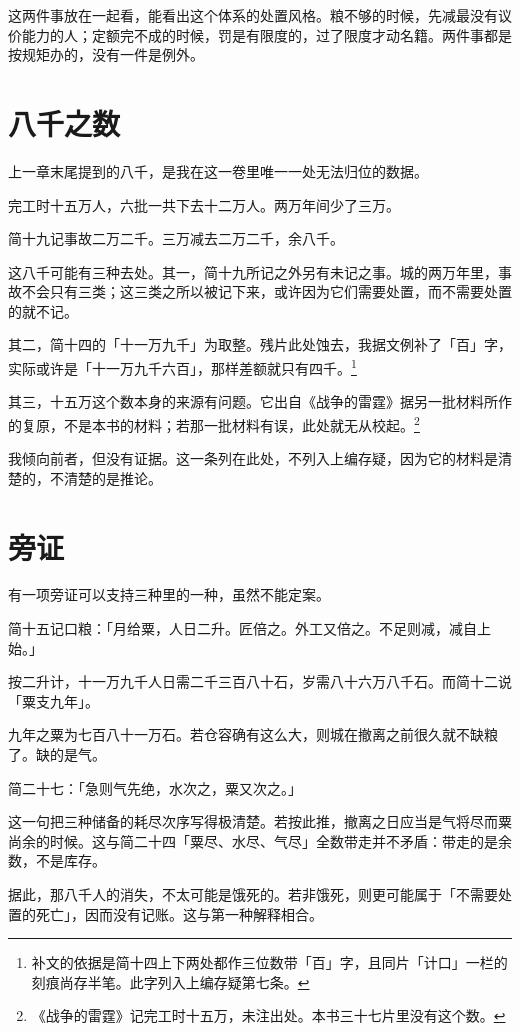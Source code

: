 这两件事放在一起看，能看出这个体系的处置风格。粮不够的时候，先减最没有议价能力的人；定额完不成的时候，罚是有限度的，过了限度才动名籍。两件事都是按规矩办的，没有一件是例外。

\section{八千之数}

上一章末尾提到的八千，是我在这一卷里唯一一处无法归位的数据。

完工时十五万人，六批一共下去十二万人。两万年间少了三万。

简十九记事故二万二千。三万减去二万二千，余八千。

这八千可能有三种去处。其一，简十九所记之外另有未记之事。城的两万年里，事故不会只有三类；这三类之所以被记下来，或许因为它们需要处置，而不需要处置的就不记。

其二，简十四的「十一万九千」为取整。残片此处蚀去，我据文例补了「百」字，实际或许是「十一万九千六百」，那样差额就只有四千。\footnote{补文的依据是简十四上下两处都作三位数带「百」字，且同片「计口」一栏的刻痕尚存半笔。此字列入上编存疑第七条。}

其三，十五万这个数本身的来源有问题。它出自《战争的雷霆》据另一批材料所作的复原，不是本书的材料；若那一批材料有误，此处就无从校起。\footnote{《战争的雷霆》记完工时十五万，未注出处。本书三十七片里没有这个数。}

我倾向前者，但没有证据。这一条列在此处，不列入上编存疑，因为它的材料是清楚的，不清楚的是推论。

\section{旁证}

有一项旁证可以支持三种里的一种，虽然不能定案。

简十五记口粮：「月给粟，人日二升。匠倍之。外工又倍之。不足则减，减自上始。」

按二升计，十一万九千人日需二千三百八十石，岁需八十六万八千石。而简十二说「粟支九年」。

九年之粟为七百八十一万石。若仓容确有这么大，则城在撤离之前很久就不缺粮了。缺的是气。

简二十七：「急则气先绝，水次之，粟又次之。」

这一句把三种储备的耗尽次序写得极清楚。若按此推，撤离之日应当是气将尽而粟尚余的时候。这与简二十四「粟尽、水尽、气尽」全数带走并不矛盾：带走的是余数，不是库存。

据此，那八千人的消失，不太可能是饿死的。若非饿死，则更可能属于「不需要处置的死亡」，因而没有记账。这与第一种解释相合。

